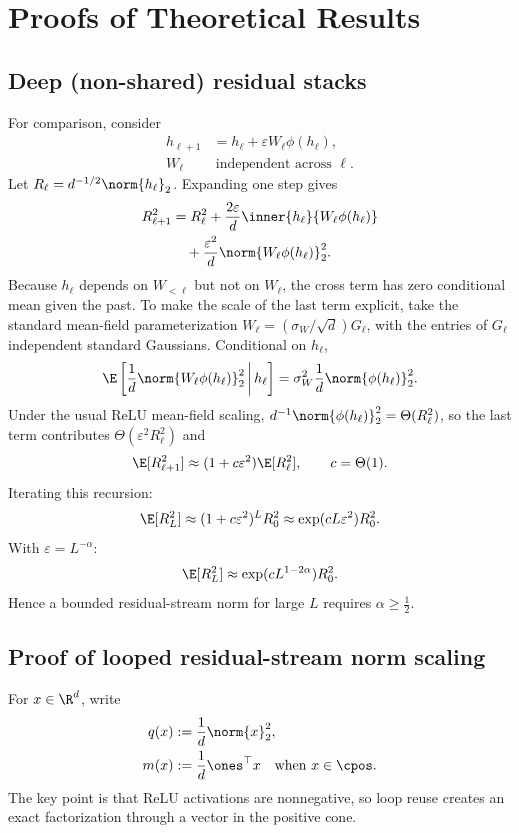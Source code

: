\appendix

\section{Proofs of Theoretical Results}
\label{app:proofs}

\subsection{Deep (non-shared) residual stacks}
\label{app:deep}

For comparison, consider
\[
  \begin{aligned}
  h_{\ell+1}&=h_\ell+\varepsilon W_\ell\phi(h_\ell),\\
  W_\ell&\ \text{independent across }\ell.
  \end{aligned}
\]
Let $R_\ell=d^{-1/2}\norm{h_\ell}_2$. Expanding one step gives
\[
  \begin{aligned}
  R_{\ell+1}^2
  &=
  R_\ell^2
  +
  \frac{2\varepsilon}{d}\inner{h_\ell}{W_\ell\phi(h_\ell)}\\
  &\quad+
  \frac{\varepsilon^2}{d}\norm{W_\ell\phi(h_\ell)}_2^2.
  \end{aligned}
\]
Because $h_\ell$ depends on $W_{<\ell}$ but not on $W_\ell$, the cross term
has zero conditional mean given the past. To make the scale of the last term
explicit, take the standard mean-field parameterization
$W_\ell=(\sigma_W/\sqrt d)G_\ell$, with the entries of $G_\ell$ independent
standard Gaussians. Conditional on $h_\ell$,
\[
  \E\left[
  \frac{1}{d}\norm{W_\ell\phi(h_\ell)}_2^2
  \,\middle|\, h_\ell
  \right]
  =
  \sigma_W^2\frac{1}{d}\norm{\phi(h_\ell)}_2^2.
\]
Under the usual ReLU mean-field scaling,
$d^{-1}\norm{\phi(h_\ell)}_2^2=\Theta(R_\ell^2)$, so the last term
contributes $\Theta(\varepsilon^2R_\ell^2)$ and
\[
  \E[R_{\ell+1}^2]
  \approx
  (1+c\varepsilon^2)\E[R_\ell^2],\qquad c=\Theta(1).
\]
Iterating this recursion:
\[
  \E[R_L^2]
  \approx
  (1+c\varepsilon^2)^L R_0^2
  \approx
  \exp(cL\varepsilon^2)R_0^2.
\]
With $\varepsilon=L^{-\alpha}$:
\[
  \E[R_L^2]\approx \exp(cL^{1-2\alpha})R_0^2.
\]
Hence a bounded residual-stream norm for large $L$ requires $\alpha\ge \tfrac12$.

\subsection{Proof of looped residual-stream norm scaling}
\label{app:theory}

For $x\in\R^d$, write
\[
  \begin{aligned}
  q(x)&:=\frac{1}{d}\norm{x}_2^2,\\
  m(x)&:=\frac{1}{d}\ones^\top x
  \quad\text{when }x\in\cpos.
  \end{aligned}
\]
The key point is that ReLU activations are nonnegative, so loop reuse creates an exact factorization through a vector in the positive cone.

